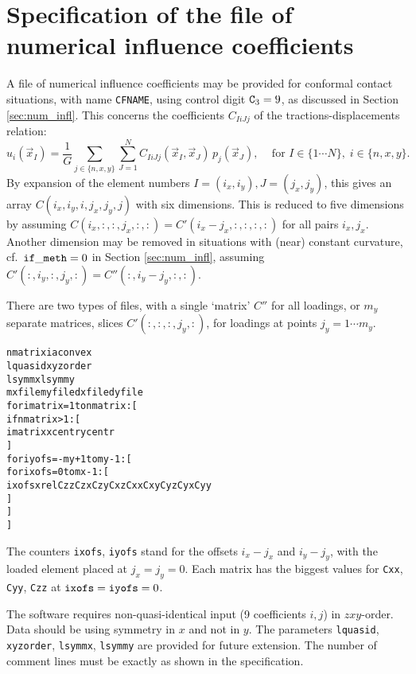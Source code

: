\documentclass[12pt]{report}
\begin{document}
\section{Specification of the file of numerical influence coefficients}
\label{sec:spec_inflcf}

A file of numerical influence coefficients may be provided for conformal
contact situations, with name {\tt CFNAME}, using control digit
${\tt C}_3=9$, as discussed in Section \ref{sec:num_infl}. This concerns
the coefficients $C_{IiJj}$ of the tractions-displacements relation:
\begin{equation}\label{eq:ui_sum_Cij_pj}
    u_i(\vec{x}_I) = \frac{1}{G} \sum_{j\in\{n,x,y\}}\sum_{J=1}^N
        C_{IiJj}(\vec{x}_I,\vec{x}_J) \, p_j(\vec{x}_J), \;\;\;
        \mbox{ for } I\in\{1\cdots N\}, \; i\in \{n,x,y\}.
\end{equation}
By expansion of the element numbers $I=(i_x,i_y), J=(j_x,j_y)$, this gives
an array $C(i_x,i_y,i,j_x,j_y,j)$ with six dimensions. This is reduced to five
dimensions by assuming $C(i_x,:,:,j_x,:,:)=C'(i_x-j_x,:,:,:,:)$ for all
pairs $i_x,j_x$. Another dimension may be removed in situations with
(near) constant curvature, cf.\ ${\tt if\_meth}=0$ in Section
\ref{sec:num_infl}, assuming $C'(:,i_y,:,j_y,:)=C''(:,i_y-j_y,:,:)$.

There are two types of files, with a single `matrix' $C''$ for all
loadings, or $m_y$ separate matrices, slices $C'(:,:,:,j_y,:)$, for
loadings at points $j_y=1\cdots m_y$.
\begin{alltt}
   nmatrix   iaconvex
   lquasid   xyzorder
   lsymmx    lsymmy
   mxfile    myfile   dxfile  dyfile
   % empty/comment line
   % empty/comment line
   for imatrix = 1 to nmatrix: [
      if nmatrix>1: [
         % empty/comment line
         imatrix  xcentr  ycentr
      ]
      for iyofs = -my+1 to my-1: [
         % empty/comment line
         % empty/comment line
         for ixofs = 0 to mx-1: [
            ixofs   xrel   Czz  Czx  Czy   Cxz  Cxx  Cxy   Cyz  Cyx  Cyy 
         ]
      ]
   ]
\end{alltt}
The counters {\tt ixofs}, {\tt iyofs} stand for the offsets $i_x-j_x$ and
$i_y-j_y$, with the loaded element placed at $j_x=j_y=0$. Each matrix has
the biggest values for {\tt Cxx}, {\tt Cyy}, {\tt Czz} at ${\tt ixofs}=
{\tt iyofs}=0$.

The software requires non-quasi-identical input (9 coefficients $i,j$) in
$zxy$-order. Data should be using symmetry in $x$ and not in $y$. The
parameters {\tt lquasid}, {\tt xyzorder}, {\tt lsymmx}, {\tt lsymmy} are
provided for future extension.
The number of comment lines must be exactly as shown in the specification.
\end{document}
